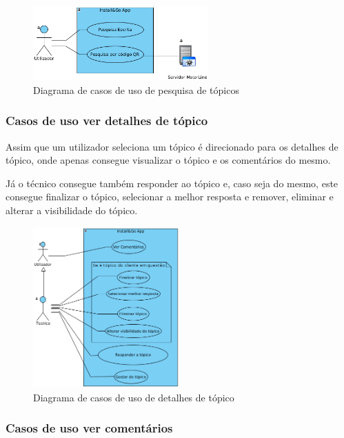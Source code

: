 \begin{figure}[htb]
    \centering
    \includegraphics[width=0.6\textwidth]{images/diagramas/casos_de_uso/use_case_forum_search.png}
    \caption{Diagrama de casos de uso de pesquisa de tópicos}
    \label{fig:10}
\end{figure}

\subsubsection{Casos de uso ver detalhes de tópico}

Assim que um utilizador seleciona um tópico é direcionado para os 
detalhes de tópico, onde apenas consegue visualizar o tópico e os comentários do mesmo.

Já o técnico consegue também responder ao tópico e, caso seja do mesmo, este consegue finalizar 
o tópico, selecionar a melhor resposta e remover, eliminar e alterar a visibilidade do tópico.

\begin{figure}[htb]
    \centering
    
    \includegraphics[width=0.5\textwidth]{images/diagramas/casos_de_uso/use_case_topic_details.png}
    \caption{Diagrama de casos de uso de detalhes de tópico}
    \label{fig:11}
\end{figure}

\subsubsection{Casos de uso ver comentários}

